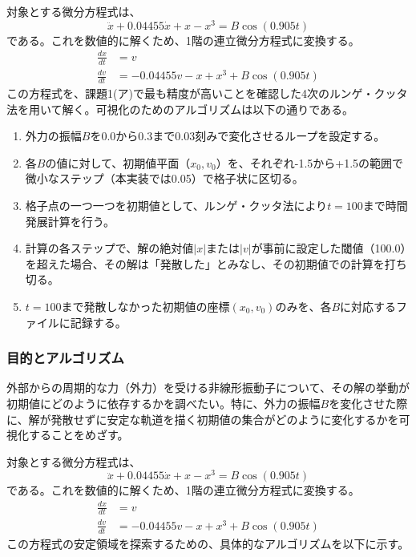 \documentclass[dvipdfmx,a4paper]{jsarticle}
\begin{document}
対象とする微分方程式は、
$$
\ddot{x} + 0.04455\dot{x} + x - x^3 = B \cos(0.905t)
$$
である。これを数値的に解くため、1階の連立微分方程式に変換する。
\begin{align*}
    \frac{dx}{dt} &= v \\
    \frac{dv}{dt} &= -0.04455v - x + x^3 + B \cos(0.905t)
\end{align*}
この方程式を、課題1(ア)で最も精度が高いことを確認した4次のルンゲ・クッタ法を用いて解く。可視化のためのアルゴリズムは以下の通りである。
\begin{enumerate}
    \item 外力の振幅$B$を$0.0$から$0.3$まで$0.03$刻みで変化させるループを設定する。
    \item 各$B$の値に対して、初期値平面（$x_0, v_0$）を、それぞれ-1.5から+1.5の範囲で微小なステップ（本実装では0.05）で格子状に区切る。
    \item 格子点の一つ一つを初期値として、ルンゲ・クッタ法により$t=100$まで時間発展計算を行う。
    \item 計算の各ステップで、解の絶対値$|x|$または$|v|$が事前に設定した閾値（100.0）を超えた場合、その解は「発散した」とみなし、その初期値での計算を打ち切る。
    \item $t=100$まで発散しなかった初期値の座標$(x_0, v_0)$のみを、各$B$に対応するファイルに記録する。
\end{enumerate}

\subsubsection{目的とアルゴリズム}
外部からの周期的な力（外力）を受ける非線形振動子について、その解の挙動が初期値にどのように依存するかを調べたい。特に、外力の振幅$B$を変化させた際に、解が発散せずに安定な軌道を描く初期値の集合がどのように変化するかを可視化することをめざす。

対象とする微分方程式は、
$$
\ddot{x} + 0.04455\dot{x} + x - x^3 = B \cos(0.905t)
$$
である。これを数値的に解くため、1階の連立微分方程式に変換する。
\begin{align*}
    \frac{dx}{dt} &= v \\
    \frac{dv}{dt} &= -0.04455v - x + x^3 + B \cos(0.905t)
\end{align*}
この方程式の安定領域を探索するための、具体的なアルゴリズムを以下に示す。
\end{document}
